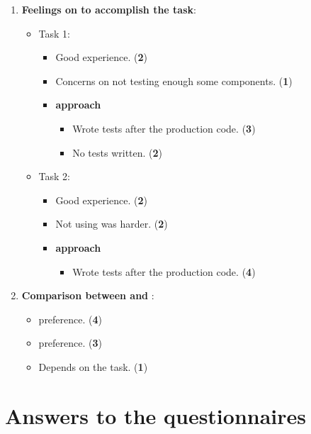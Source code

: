 \begin{enumerate}
    \item \textbf{Feelings on \notdd to accomplish the task}:
    \begin{itemize}
        \item Task 1:
        \begin{itemize}
            \item Good experience. (\textbf{2})
            \item Concerns on not testing enough some components. (\textbf{1})
            \item \textbf{\notdd approach}
            \begin{itemize}
                \item Wrote tests after the production code. (\textbf{3})
                \item No tests written. (\textbf{2})
            \end{itemize}
        \end{itemize}

        \item Task 2:
        \begin{itemize}
            \item Good experience. (\textbf{2})
            \item Not using \tdd was harder. (\textbf{2})
            \item \textbf{\notdd approach}
            \begin{itemize}
                \item Wrote tests after the production code. (\textbf{4})
            \end{itemize}
        \end{itemize}
    \end{itemize}
    
    \item \textbf{Comparison between \tdd and \notdd}:
    \begin{itemize}
        \item \tdd preference. (\textbf{4})
        \item \notdd preference. (\textbf{3})
        \item Depends on the task. (\textbf{1})
    \end{itemize}
\end{enumerate}

\section{Answers to the questionnaires}
